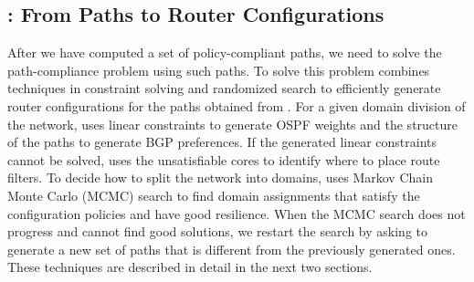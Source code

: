 \subsection{\name: From Paths to Router Configurations} 
After we have computed a set of policy-compliant paths,
we need to solve the path-compliance problem using such paths.
To solve this problem \name
combines techniques in constraint solving and randomized search
to efficiently generate router configurations for the paths obtained from \genesis.
For a given domain division of the network,
\name uses linear constraints to generate OSPF weights and 
the structure of the paths  to generate BGP preferences.
If the generated linear  constraints cannot be solved, \name uses the unsatisfiable cores to
identify where to place route filters.
To decide how to split the network into domains,
\name uses Markov Chain Monte Carlo (MCMC) search to find
domain assignments that satisfy the configuration policies and have good resilience.
When the MCMC search does not progress and cannot find good solutions,
we restart the search by asking \genesis to generate a new set of paths that is different from
the previously generated ones.
These techniques are described in detail in the next two sections.

